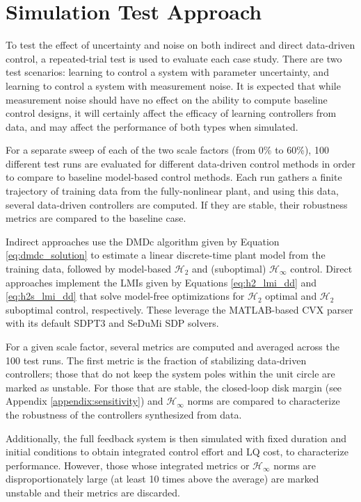 \section{Simulation Test Approach}
\label{sect:results:testapproach}
To test the effect of uncertainty and noise on both indirect and direct data-driven control, a repeated-trial test is used to evaluate each case study.  There are two test scenarios: learning to control a system with parameter uncertainty, and learning to control a system with measurement noise.  It is expected that while measurement noise should have no effect on the ability to compute baseline control designs, it will certainly affect the efficacy of learning controllers from data, and may affect the performance of both types when simulated.

For a separate sweep of each of the two scale factors (from 0\% to 60\%), 100 different test runs are evaluated for different data-driven control methods in order to compare to baseline model-based control methods.  Each run gathers a finite trajectory of training data from the fully-nonlinear plant, and using this data, several data-driven controllers are computed.  If they are stable, their robustness metrics are compared to the baseline case.

Indirect approaches use the DMDc algorithm given by Equation \eqref{eq:dmdc_solution} to estimate a linear discrete-time plant model from the training data, followed by model-based $\mathcal{H}_{2}$ and (suboptimal) $\mathcal{H}_{\infty}$ control.  Direct approaches implement the LMIs given by Equations \eqref{eq:h2_lmi_dd} and \eqref{eq:h2s_lmi_dd} that solve model-free optimizations for $\mathcal{H}_{2}$ optimal and $\mathcal{H}_{2}$ suboptimal control, respectively.  These leverage the MATLAB-based CVX parser \cite{grant2008graph, grant2008cvx} with its default SDPT3 \cite{toh1999sdpt3, tutuncu2001sdpt3} and SeDuMi \cite{sturm1999using} SDP solvers.

For a given scale factor, several metrics are computed and averaged across the 100 test runs.  The first metric is the fraction of stabilizing data-driven controllers; those that do not keep the system poles within the unit circle are marked as unstable.  For those that are stable, the closed-loop disk margin (see Appendix \ref{appendix:sensitivity}) and $\mathcal{H}_{\infty}$ norms are compared to characterize the robustness of the controllers synthesized from data.

Additionally, the full feedback system is then simulated with fixed duration and initial conditions to obtain integrated control effort and LQ cost, to characterize performance.  However, those whose integrated metrics or $\mathcal{H}_{\infty}$ norms are disproportionately large (at least 10 times above the average) are marked unstable and their metrics are discarded.

